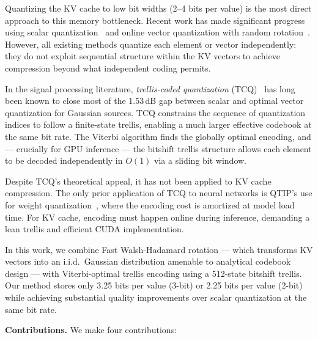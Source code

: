 \documentclass{article}
\begin{document}
Quantizing the KV cache to low bit widths (2--4 bits per value) is the most
direct approach to this memory bottleneck. Recent work has made significant
progress using scalar quantization~\cite{kivi2024,kvquant2024} and online
vector quantization with random rotation~\cite{turboquant2026}. However, all
existing methods quantize each element or vector independently: they do not
exploit sequential structure within the KV vectors to achieve compression
beyond what independent coding permits.

In the signal processing literature, \emph{trellis-coded quantization}
(TCQ)~\cite{marcellin1990tcq} has long been known to close most of the 1.53\,dB
gap between scalar and optimal vector quantization for Gaussian sources. TCQ
constrains the sequence of quantization indices to follow a finite-state
trellis, enabling a much larger effective codebook at the same bit rate. The
Viterbi algorithm finds the globally optimal encoding, and — crucially for GPU
inference — the bitshift trellis structure allows each element to be decoded
independently in $O(1)$ via a sliding bit window.

Despite TCQ's theoretical appeal, it has not been applied to KV cache
compression. The only prior application of TCQ to neural networks is QTIP's
use for weight quantization~\cite{qtip2024}, where the encoding cost is
amortized at model load time. For KV cache, encoding must happen online
during inference, demanding a lean trellis and efficient CUDA implementation.

In this work, we combine Fast Walsh-Hadamard rotation — which transforms KV
vectors into an i.i.d.\ Gaussian distribution amenable to analytical codebook
design — with Viterbi-optimal trellis encoding using a 512-state bitshift
trellis. Our method stores only 3.25 bits per value (3-bit) or 2.25 bits per
value (2-bit) while achieving substantial quality improvements over scalar
quantization at the same bit rate.

\textbf{Contributions.} We make four contributions:
\end{document}
